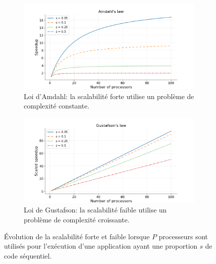             \begin{figure}[t!]
                \centering
                \begin{subfigure}[t]{0.48\textwidth}
                    \centering
                    \includegraphics[width=1.05\linewidth]{images/scaling_amdahl.png}
                    \caption{\label{fig:scaling_amdahl}Loi d'Amdahl: la scalabilité forte utilise un problème de complexité constante.}
                \end{subfigure}\hfill
            \begin{subfigure}[t]{0.48\textwidth}
                    \centering
                    \includegraphics[width=1.05\linewidth]{images/scaling_gustafson.png}
                    \caption{\label{fig:scaling_gustafson}Loi de Gustafson: la scalabilité faible utilise un problème de complexité croissante.}
                \end{subfigure}
                \caption{\label{fig:scaling} Évolution de la scalabilité forte et faible lorsque $P$ processeurs sont utilisés pour l'exécution d'une application ayant une proportion $s$ de code séquentiel\protect\footnotemark.}
            \end{figure}
            

